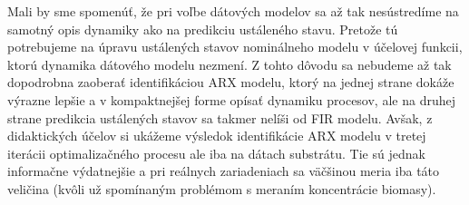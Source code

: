 Mali by sme spomenúť, že pri voľbe dátových modelov sa až tak nesústredíme na samotný opis dynamiky ako na predikciu ustáleného stavu. Pretože tú potrebujeme na úpravu ustálených stavov nominálneho modelu v účelovej funkcii, ktorú dynamika dátového modelu nezmení. Z tohto dôvodu sa nebudeme až tak dopodrobna zaoberať identifikáciou ARX modelu, ktorý na jednej strane dokáže výrazne lepšie a v kompaktnejšej forme opísať dynamiku procesov, ale na druhej strane predikcia ustálených stavov sa takmer nelíši od FIR modelu. Avšak,
z didaktických účelov si ukážeme výsledok identifikácie ARX modelu v tretej iterácii optimalizačného procesu ale iba na dátach substrátu. Tie sú jednak informačne výdatnejšie a pri reálnych zariadeniach sa väčšinou meria iba táto veličina (kvôli už spomínaným problémom s meraním koncentrácie biomasy).

